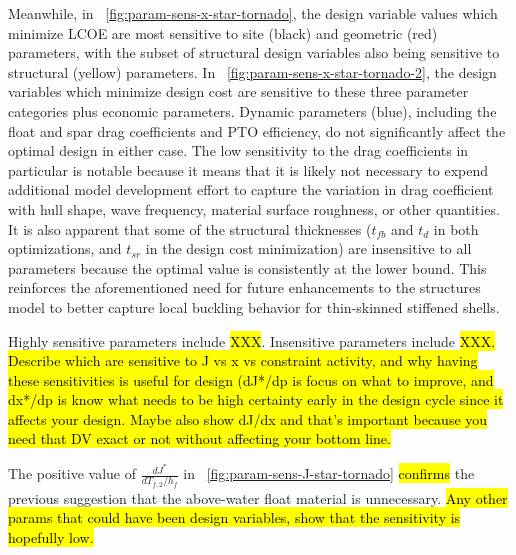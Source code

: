 Meanwhile, in \figureautorefname~\ref{fig:param-sens-x-star-tornado}, the design variable values which minimize LCOE are most sensitive to site (black) and geometric (red) parameters, with the subset of structural design variables also being sensitive to structural (yellow) parameters. In \figureautorefname~\ref{fig:param-sens-x-star-tornado-2}, the design variables which minimize design cost are sensitive to these three parameter categories plus economic parameters. Dynamic parameters (blue), including the float and spar drag coefficients and PTO efficiency, do not significantly affect the optimal design in either case. The low sensitivity to the drag coefficients in particular is notable because it means that it is likely not necessary to expend additional model development effort to capture the variation in drag coefficient with hull shape, wave frequency, material surface roughness, or other quantities. It is also apparent that some of the structural thicknesses ($t_{fb}$ and $t_d$ in both optimizations, and $t_{sr}$ in the design cost minimization) are insensitive to all parameters because the optimal value is consistently at the lower bound. This reinforces the aforementioned need for future enhancements to the structures model to better capture local buckling behavior for thin-skinned stiffened shells.

Highly sensitive parameters include \hl{XXX}. Insensitive parameters include \hl{XXX. Describe which are sensitive to J vs x vs constraint activity, and why having these sensitivities is useful for design (dJ*/dp is focus on what to improve, and dx*/dp is know what needs to be high certainty early in the design cycle since it affects your design. Maybe also show dJ/dx and that's important because you need that DV exact or not without affecting your bottom line. }


The positive value of $\frac{dJ^*}{dT_{f,2}/h_f}$ in \figureautorefname~\ref{fig:param-sens-J-star-tornado} \hl{confirms} the previous suggestion that the above-water float material is unnecessary.
\hl{Any other params that could have been design variables, show that the sensitivity is hopefully low.}


